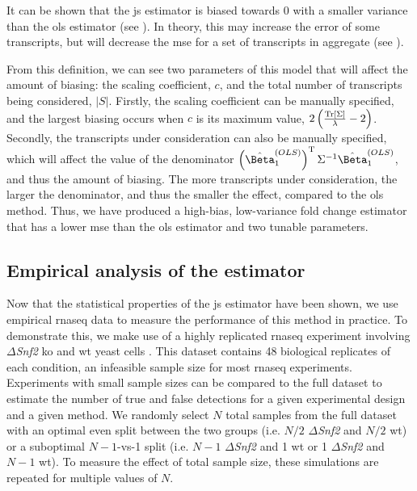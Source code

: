 It can be shown that the \gls{js} estimator is biased towards 0 with a smaller variance than the \gls{ols} estimator (see ).
In theory, this may increase the error of some transcripts, but will decrease the \gls{mse} for a set of transcripts in aggregate (see ).

From this definition, we can see two parameters of this model that will affect the amount of biasing: the scaling coefficient, $c$, and the total number of transcripts being considered, $|S|$.
Firstly, the scaling coefficient can be manually specified, and the largest biasing occurs when $c$ is its maximum value, $2 \left( \frac{\mathrm{Tr} \left[ \Sigma \right]}{\lambda} - 2 \right)$.
Secondly, the transcripts under consideration can also be manually specified, which will affect the value of the denominator $\left( \hat{\Beta}_1^{(OLS)} \right)^\tran \Sigma^{-1} \hat{\Beta}_1^{(OLS)}$, and thus the amount of biasing.
The more transcripts under consideration, the larger the denominator, and thus the smaller the effect, compared to the \gls{ols} method.
Thus, we have produced a high-bias, low-variance fold change estimator that has a lower \gls{mse} than the \gls{ols} estimator and two tunable parameters.

\subsection{Empirical analysis of the  estimator}

Now that the statistical properties of the \gls{js} estimator have been shown, we use empirical \gls{rnaseq} data to measure the performance of this method in practice.
To demonstrate this, we make use of a highly replicated \gls{rnaseq} experiment involving $\Delta$\emph{Snf2} \gls{ko} and \gls{wt} yeast cells \cite{gierlinskiStatisticalModelsRNAseq2015}.
This dataset contains 48 biological replicates of each condition, an infeasible sample size for most \gls{rnaseq} experiments.
Experiments with small sample sizes can be compared to the full dataset to estimate the number of true and false detections for a given experimental design and a given method.
We randomly select $N$ total samples from the full dataset with an optimal even split between the two groups (i.e. $N / 2$ $\Delta$\emph{Snf2} and $N / 2$ \gls{wt}) or a suboptimal $N - 1$-vs-1 split (i.e. $N - 1$ $\Delta$\emph{Snf2} and 1 \gls{wt} or 1 $\Delta$\emph{Snf2} and $N - 1$ \gls{wt}).
To measure the effect of total sample size, these simulations are repeated for multiple values of $N$.

